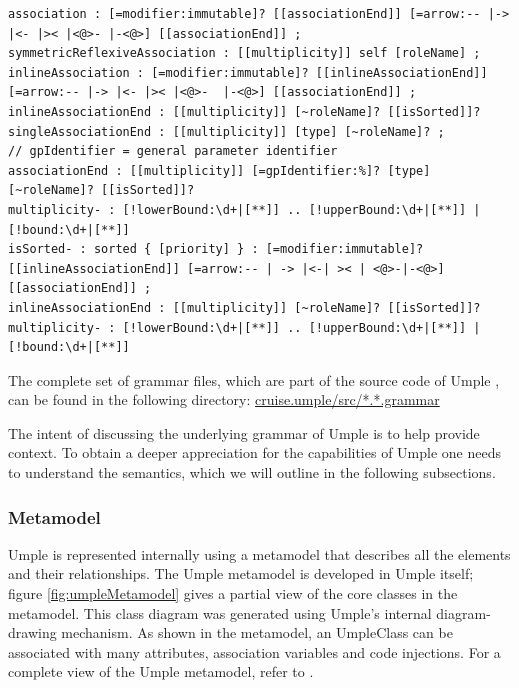 \begin{lstlisting}[language={grammar}, label=lst:fullGrammar3,caption=Umple grammar for associations]
association : [=modifier:immutable]? [[associationEnd]] [=arrow:-- |-> |<- |>< |<@>- |-<@>] [[associationEnd]] ;
symmetricReflexiveAssociation : [[multiplicity]] self [roleName] ;
inlineAssociation : [=modifier:immutable]? [[inlineAssociationEnd]] [=arrow:-- |-> |<- |>< |<@>-  |-<@>] [[associationEnd]] ;
inlineAssociationEnd : [[multiplicity]] [~roleName]? [[isSorted]]?
singleAssociationEnd : [[multiplicity]] [type] [~roleName]? ;
// gpIdentifier = general parameter identifier
associationEnd : [[multiplicity]] [=gpIdentifier:%]? [type] [~roleName]? [[isSorted]]?
multiplicity- : [!lowerBound:\d+|[**]] .. [!upperBound:\d+|[**]] | [!bound:\d+|[**]]
isSorted- : sorted { [priority] } : [=modifier:immutable]? [[inlineAssociationEnd]] [=arrow:-- | -> |<-| >< | <@>-|-<@>] [[associationEnd]] ;
inlineAssociationEnd : [[multiplicity]] [~roleName]? [[isSorted]]?
multiplicity- : [!lowerBound:\d+|[**]] .. [!upperBound:\d+|[**]] | [!bound:\d+|[**]]
\end{lstlisting}

The complete set of grammar files, which are part of the source code of Umple \cite{umpleRepository}, can be found in the following directory:
\url{cruise.umple/src/*.*.grammar}

The intent of discussing the underlying grammar of Umple is to help provide context. To obtain a deeper appreciation for the capabilities of Umple one needs to understand the semantics, which we will outline in the following subsections.

\subsubsection{Metamodel}
Umple is represented internally using a metamodel that describes all the elements and their relationships. The Umple metamodel is developed in Umple itself; figure \ref{fig:umpleMetamodel} gives a partial view of the core classes in the metamodel. This class diagram was generated using Umple's internal diagram-drawing mechanism. As shown in the metamodel, an UmpleClass can be associated with many attributes, association variables and code injections. For a complete view of the Umple metamodel, refer to \cite{UmpleMetamodel}.


